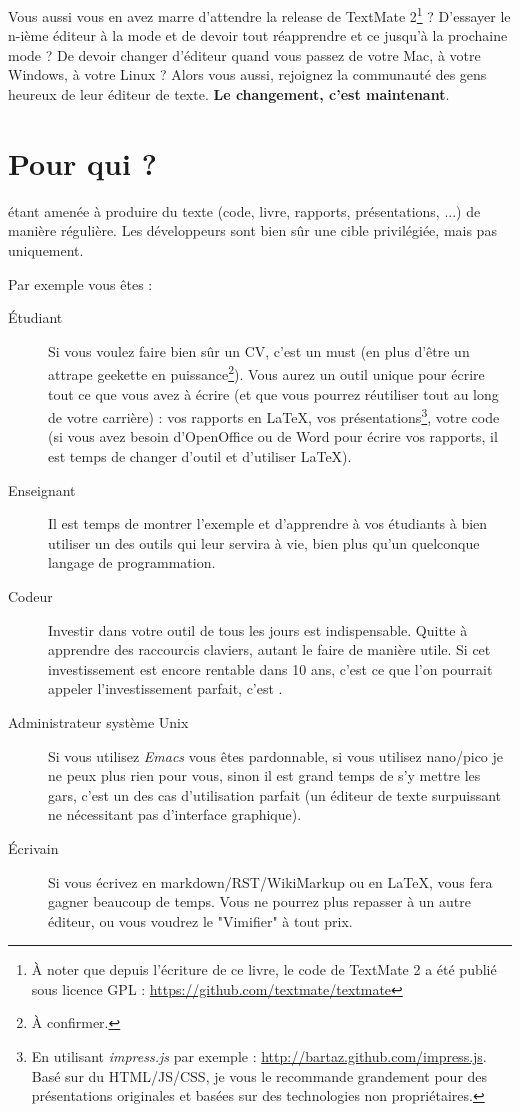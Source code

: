 Vous aussi vous en avez marre d'attendre la release de TextMate 2\footnote{À noter que depuis l'écriture de ce livre, le code de TextMate 2 a été publié sous licence GPL : \url{https://github.com/textmate/textmate}} ? D'essayer le n-ième éditeur à la mode et de devoir tout réapprendre et ce jusqu'à la prochaine mode ? De devoir changer d'éditeur quand vous passez de votre Mac, à votre Windows, à votre Linux ? Alors vous aussi, rejoignez la communauté des gens heureux de leur éditeur de texte. \textbf{Le changement, c'est maintenant}.

\section{Pour qui ?}

 étant amenée à produire du texte (code, livre, rapports, présentations, ...) de manière régulière. Les développeurs sont bien sûr une cible privilégiée, mais pas uniquement.

Par exemple vous êtes :
\begin{description}
    \item[Étudiant] Si vous voulez faire bien sûr un CV, c'est un must (en plus d'être un attrape geekette en puissance\footnote{À confirmer.}). Vous aurez un outil unique pour écrire tout ce que vous avez à écrire (et que vous pourrez réutiliser tout au long de votre carrière) : vos rapports en \LaTeX, vos présentations\footnote{En utilisant \emph{impress.js} par exemple : \url{http://bartaz.github.com/impress.js}. Basé sur du HTML/JS/CSS, je vous le recommande grandement pour des présentations originales et basées sur des technologies non propriétaires.}, votre code (si vous avez besoin d'OpenOffice ou de Word pour écrire vos rapports, il est temps de changer d'outil et d'utiliser \LaTeX).
    \item[Enseignant] Il est temps de montrer l'exemple et d'apprendre à vos étudiants à bien utiliser un des outils qui leur servira à vie, bien plus qu'un quelconque langage de programmation.
    \item[Codeur] Investir dans votre outil de tous les jours est indispensable. Quitte à apprendre des raccourcis claviers, autant le faire de manière utile. Si cet investissement est encore rentable dans 10 ans, c'est ce que l'on pourrait appeler l'investissement parfait, c'est \vim.
    \item[Administrateur système Unix] Si vous utilisez \emph{Emacs} vous êtes pardonnable, si vous utilisez nano/pico je ne peux plus rien pour vous, sinon il est grand temps de s'y mettre les gars, c'est un des cas d'utilisation parfait (un éditeur de texte surpuissant ne nécessitant pas d'interface graphique).
    \item[Écrivain] Si vous écrivez en markdown/RST/WikiMarkup ou en \LaTeX, \vim vous fera gagner beaucoup de temps. Vous ne pourrez plus repasser à un autre éditeur, ou vous voudrez le "Vimifier" à tout prix.
\end{description}

